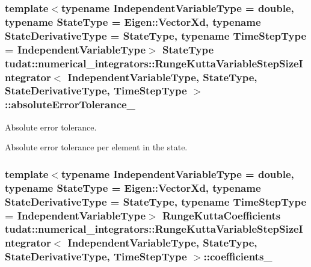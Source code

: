 \subsubsection[{\texorpdfstring{absolute\+Error\+Tolerance\+\_\+}{absoluteErrorTolerance_}}]{\setlength{\rightskip}{0pt plus 5cm}template$<$typename Independent\+Variable\+Type  = double, typename State\+Type  = Eigen\+::\+Vector\+Xd, typename State\+Derivative\+Type  = State\+Type, typename Time\+Step\+Type  = Independent\+Variable\+Type$>$ State\+Type {\bf tudat\+::numerical\+\_\+integrators\+::\+Runge\+Kutta\+Variable\+Step\+Size\+Integrator}$<$ Independent\+Variable\+Type, State\+Type, State\+Derivative\+Type, Time\+Step\+Type $>$\+::absolute\+Error\+Tolerance\+\_\+\hspace{0.3cm}{\ttfamily [protected]}}\hypertarget{classtudat_1_1numerical__integrators_1_1RungeKuttaVariableStepSizeIntegrator_aac2980ff2ed5a6a44333cf7843b7fa39}{}\label{classtudat_1_1numerical__integrators_1_1RungeKuttaVariableStepSizeIntegrator_aac2980ff2ed5a6a44333cf7843b7fa39}


Absolute error tolerance. 

Absolute error tolerance per element in the state. 
\subsubsection[{\texorpdfstring{coefficients\+\_\+}{coefficients_}}]{\setlength{\rightskip}{0pt plus 5cm}template$<$typename Independent\+Variable\+Type  = double, typename State\+Type  = Eigen\+::\+Vector\+Xd, typename State\+Derivative\+Type  = State\+Type, typename Time\+Step\+Type  = Independent\+Variable\+Type$>$ {\bf Runge\+Kutta\+Coefficients} {\bf tudat\+::numerical\+\_\+integrators\+::\+Runge\+Kutta\+Variable\+Step\+Size\+Integrator}$<$ Independent\+Variable\+Type, State\+Type, State\+Derivative\+Type, Time\+Step\+Type $>$\+::coefficients\+\_\+\hspace{0.3cm}{\ttfamily [protected]}}\hypertarget{classtudat_1_1numerical__integrators_1_1RungeKuttaVariableStepSizeIntegrator_afa92d7f9d7befc0d9586040ad848c70c}{}\label{classtudat_1_1numerical__integrators_1_1RungeKuttaVariableStepSizeIntegrator_afa92d7f9d7befc0d9586040ad848c70c}



